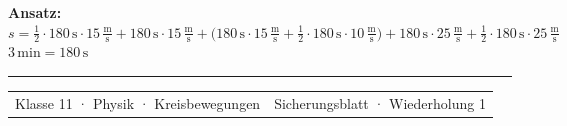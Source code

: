 \documentclass[10pt,a4paper]{article}
\begin{document}
\vspace{0.6mm}
\colorbox{Mint}{\parbox{\dimexpr\linewidth-2\fboxsep\relax}{\small%
  \vspace{0.8mm}\textbf{Ansatz:}\enspace
  $s=\tfrac{1}{2}\cdot180\,\mathrm{s}\cdot15\,\mathrm{\tfrac{m}{s}}
  +180\,\mathrm{s}\cdot15\,\mathrm{\tfrac{m}{s}}
  +\bigl(180\,\mathrm{s}\cdot15\,\mathrm{\tfrac{m}{s}}+\tfrac{1}{2}\cdot180\,\mathrm{s}\cdot10\,\mathrm{\tfrac{m}{s}}\bigr)
  +180\,\mathrm{s}\cdot25\,\mathrm{\tfrac{m}{s}}
  +\tfrac{1}{2}\cdot180\,\mathrm{s}\cdot25\,\mathrm{\tfrac{m}{s}}$\hfill{\scriptsize $3\,\mathrm{min}=180\,\mathrm{s}$}\vspace{0.8mm}}}

\vfill
{\color{Line}\rule{\linewidth}{0.5pt}}\par
\vspace{1.2mm}
\begin{tabularx}{\linewidth}{@{}Xr@{}}
  {\small\color{Muted}Klasse 11 · Physik · Kreisbewegungen} &
  {\small\color{Muted}Sicherungsblatt · Wiederholung 1}
\end{tabularx}
\end{document}
